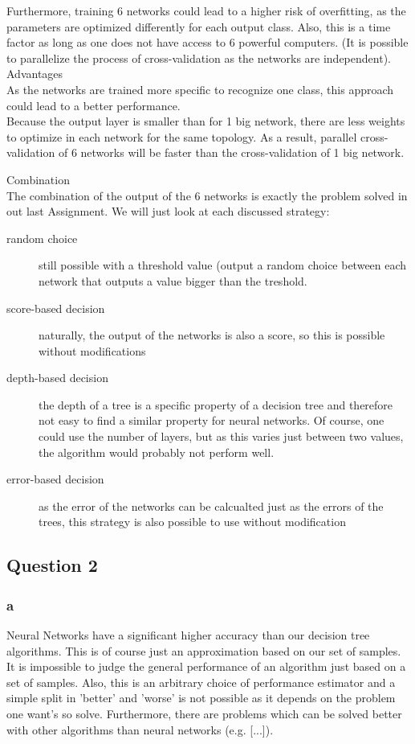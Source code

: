\documentclass{article}
\begin{document}
Furthermore, training 6 networks could lead to a higher risk of overfitting, as the parameters are optimized differently for each output class. Also, this is a time factor as long as one does not have access to 6 powerful computers. (It is possible to parallelize the process of cross-validation as the networks are independent).
\\
Advantages\\
As the networks are trained more specific to recognize one class, this approach could lead to a better performance.\\
Because the output layer is smaller than for 1 big network, there are less weights to optimize in each network for the same topology. As a result, parallel cross-validation of 6 networks will be faster than the cross-validation of 1 big network.

Combination\\
The combination of the output of the 6 networks is exactly the problem solved in out last Assignment. We will just look at each discussed strategy:
\begin{description}
    \item[random choice] still possible with a threshold value (output a random choice between each network that outputs a value bigger than the treshold.
    \item[score-based decision] naturally, the output of the networks is also a score, so this is possible without modifications
    \item[depth-based decision] the depth of a tree is a specific property of a decision tree and therefore not easy to find a similar property for neural networks. Of course, one could use the number of layers, but as this varies just between two values, the algorithm would probably not perform well.
    \item[error-based decision] as the error of the networks can be calcualted just as the errors of the trees, this strategy is also possible to use without modification
\end{description}

\subsection{Question 2}
\subsubsection{a}
Neural Networks have a significant higher accuracy than our decision tree algorithms. This is of course just an approximation based on our set of samples. It is impossible to judge the general performance of an algorithm just based on a set of samples. Also, this is an arbitrary choice of performance estimator and a simple split in 'better' and 'worse' is not possible as it depends on the problem one want's so solve.
Furthermore, there are problems which can be solved better with other algorithms than neural networks (e.g.  [...]).
\end{document}
